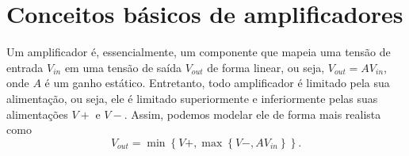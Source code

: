 
\section*{Conceitos básicos de amplificadores}

Um amplificador é, essencialmente, um componente que mapeia uma tensão de entrada $V_{in}$ em uma tensão de saída $V_{out}$ de forma linear, ou seja, $V_{out}=A V_{in}$, onde $A$ é um ganho estático. Entretanto, todo amplificador é limitado pela sua alimentação, ou seja, ele é limitado superiormente e inferiormente pelas suas alimentações $V+$ e $V-$. Assim, podemos modelar ele de forma mais realista como \[
    V_{out} = \min\left\{ V+, \max\left\{ V-, A V_{in} \right\}  \right\} 
.\] 

